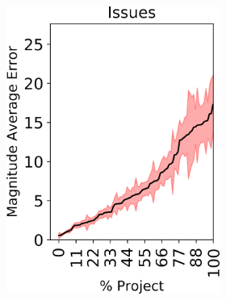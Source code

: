 \begin{figure}[tp!]
\begin{subfigure}[t]{\linewidth}
\begin{subfigure}[t]{0.33\linewidth}
		\includegraphics[width=\linewidth]{images/RQ1/inhouse/Issues.png}
	\end{subfigure}%
	~
	\centering
		\begin{subfigure}[t]{0.33\linewidth}
		\centering

\end{subfigure}
\end{subfigure}
\end{figure}
